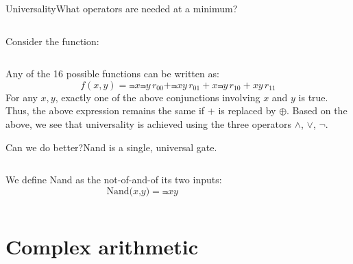 \begin{frame}{Universality}{What operators are needed at a minimum?}
\begin{columns}
\begin{column}{0.5\textwidth}
Consider the function:
\end{column}
\end{columns}
\MedSkip{}
Any of the 16 possible functions can be written as:
\[
f(x,y) = \Not{x}\Not{y}\,r_{00} +\Not{x}y \,r_{01} + x\Not{y}\, r_{10} +xy \,r_{11} 
\]
For any $x,y$, exactly one of the above conjunctions involving $x$ and $y$ is true.  Thus, the above expression remains the same if $+$ is replaced by $\oplus$.  
\MedSkip{}
Based on the above, we see that universality is achieved using the three operators $\wedge$, $\vee$, $\neg$.
\end{frame}



\begin{frame}{Can we do better?}{Nand is a single, universal gate.}
\begin{columns}
\begin{column}{0.6\textwidth}
We define Nand as the not-of-and-of its two inputs:
\[
\mbox{Nand($x$,$y$)} = \Not{xy}
\]
\end{column}
\begin{column}{0.4\textwidth}
\end{column}
\end{columns}
\end{frame}

\section{Complex arithmetic}

